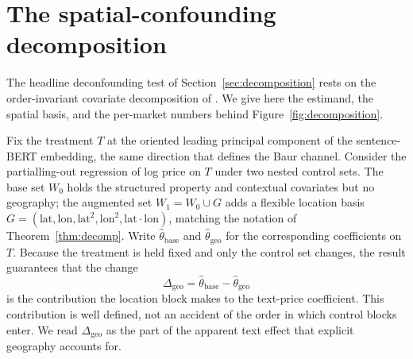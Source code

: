 
\section{The spatial-confounding decomposition}
\label{app:decomposition}

The headline deconfounding test of Section~\ref{sec:decomposition} rests on the order-invariant covariate decomposition of \citet{gelbach2016covariates}. We give here the estimand, the spatial basis, and the per-market numbers behind Figure~\ref{fig:decomposition}.

Fix the treatment $T$ at the oriented leading principal component of the sentence-BERT embedding, the same direction that defines the Baur channel. Consider the partialling-out regression of log price on $T$ under two nested control sets. The base set $W_0$ holds the structured property and contextual covariates but no geography; the augmented set $W_1 = W_0 \cup G$ adds a flexible location basis $G = (\mathrm{lat}, \mathrm{lon}, \mathrm{lat}^2, \mathrm{lon}^2, \mathrm{lat}\cdot\mathrm{lon})$, matching the notation of Theorem~\ref{thm:decomp}. Write $\hat\theta_{\text{base}}$ and $\hat\theta_{\text{geo}}$ for the corresponding coefficients on $T$. Because the treatment is held fixed and only the control set changes, the \citet{gelbach2016covariates} result guarantees that the change
\begin{equation}
\Delta_{\text{geo}} = \hat\theta_{\text{base}} - \hat\theta_{\text{geo}}
\label{eq:gelbach}
\end{equation}
is the contribution the location block makes to the text-price coefficient. This contribution is well defined, not an accident of the order in which control blocks enter. We read $\Delta_{\text{geo}}$ as the part of the apparent text effect that explicit geography accounts for.

